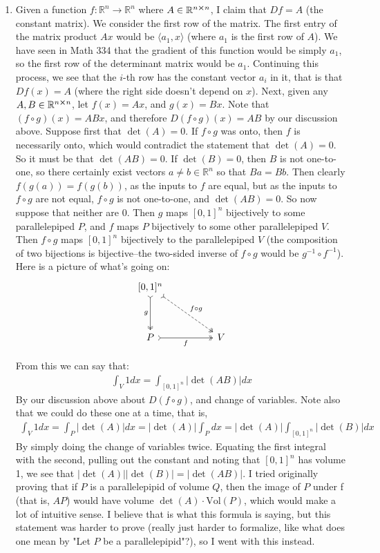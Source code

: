 \documentclass[12pt]{article}
\theoremstyle{definition}
\theoremstyle{remark}
\newcommand{\R}{\mathbb{R}}
\renewcommand{\ip}[2]{\langle #1, #2 \rangle}
\begin{document}
\begin{enumerate}[leftmargin=\labelsep]
		\item Given a function $f: \R^n \to \R^n$ where $A \in \R^{n \cross n}$, I claim that $Df=A$ (the constant matrix). We consider the first row of the matrix. The first entry of the matrix product $Ax$ would be $\ip{a_1}{x}$ (where $a_1$ is the first row of $A$). We have seen in Math 334 that the gradient of this function would be simply $a_1$, so the first row of the determinant matrix would be $a_1$. Continuing this process, we see that the $i$-th row has the constant vector $a_i$ in it, that is that $Df(x) = A$ (where the right side doesn't depend on $x$). Next, given any $A, B \in \R^{n \cross n}$, let $f(x) = Ax$, and $g(x) = Bx$. Note that $(f \circ g)(x) = ABx$, and therefore $D(f \circ g)(x) = AB$ by our discussion above. Suppose first that $\det(A) = 0$. If $f \circ g$ was onto, then $f$ is necessarily onto, which would contradict the statement that $\det(A) = 0$. So it must be that $\det(AB) = 0$. If $\det(B) = 0$, then $B$ is not one-to-one, so there certainly exist vectors $a \neq b \in \R^n$ so that $Ba = Bb$. Then clearly $f(g(a)) = f(g(b))$, as the inputs to $f$ are equal, but as the inputs to $f \circ g$ are not equal, $f \circ g$ is not one-to-one, and $\det(AB) = 0$. So now suppose that neither are 0. Then $g$ maps $[0,1]^n$ bijectively to some parallelepiped $P$, and $f$ maps $P$ bijectively to some other parallelepiped $V$. Then $f \circ g$ maps $[0,1]^n$ bijectively to the parallelepiped $V$ (the composition of two bijections is bijective--the two-sided inverse of $f \circ g$ would be $g^{-1} \circ f^{-1}$). Here is a picture of what's going on:
		\[\begin{tikzcd}
			{[0,1]^n} \\
			\\
			P && V
			\arrow["{f \circ g}", dashed, tail, two heads, from=1-1, to=3-3]
			\arrow["g"', tail, two heads, from=1-1, to=3-1]
			\arrow["f"', tail, two heads, from=3-1, to=3-3]
		\end{tikzcd}\]
		
		From this we can say that:
		\begin{align*}
			\int_V 1dx = \int_{[0,1]^n} |\det(AB)|dx
		\end{align*}
		By our discussion above about $D(f\circ g)$, and change of variables. Note also that we could do these one at a time, that is,
		\begin{align*}
			\int_V 1dx = \int_P |\det(A)|dx = |\det(A)| \int_P dx = |\det(A)| \int_{[0,1]^n} |\det(B)|dx
		\end{align*}
		By simply doing the change of variables twice. Equating the first integral with the second, pulling out the constant and noting that $[0,1]^n$ has volume 1, we see that $|\det(A)||\det(B)|=|\det(AB)|$. I tried originally proving that if $P$ is a parallelepipid of volume $Q$, then the image of $P$ under f (that is, $AP$) would have volume $\det(A) \cdot \mathrm{Vol}(P)$, which would make a lot of intuitive sense. I believe that is what this formula is saying, but this statement was harder to prove (really just harder to formalize, like what does one mean by "Let $P$ be a parallelepipid"?), so I went with this instead.
		

\end{enumerate}
\end{document}
